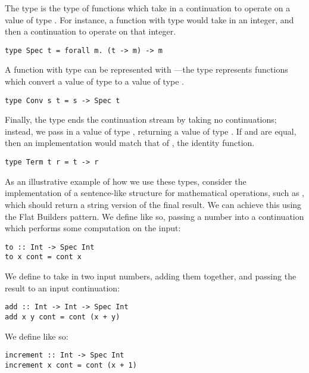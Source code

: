 The type  is the type of functions which take in a continuation to operate on a value of type . For instance, a function with type  would take in an integer, and then a continuation to operate on that integer.

\begin{lstlisting}
type Spec t = forall m. (t -> m) -> m
\end{lstlisting}

A function with type  can be represented with ---the  type represents functions which convert a value of type  to a value of type .

\begin{lstlisting}
type Conv s t = s -> Spec t
\end{lstlisting}

Finally, the  type ends the continuation stream by taking no continuations; instead, we pass in a value of type , returning a value of type . If  and  are equal, then an implementation would match that of , the identity function.

\begin{lstlisting}
type Term t r = t -> r
\end{lstlisting}

As an illustrative example of how we use these types, consider the implementation of a sentence-like structure for mathematical operations, such as , which should return a string version of the final result. We can achieve this using the Flat Builders pattern. We define  like so, passing a number into a continuation which performs some computation on the input:

\begin{lstlisting}
to :: Int -> Spec Int
to x cont = cont x
\end{lstlisting}

We define  to take in two input numbers, adding them together, and passing the result to an input continuation:

\begin{lstlisting}
add :: Int -> Int -> Spec Int
add x y cont = cont (x + y)
\end{lstlisting}

We define  like so:

\begin{lstlisting}
increment :: Int -> Spec Int
increment x cont = cont (x + 1)
\end{lstlisting}

